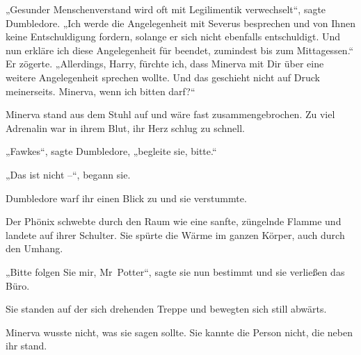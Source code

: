 „Gesunder Menschenverstand wird oft mit Legilimentik verwechselt“, sagte Dumbledore. „Ich werde die Angelegenheit mit Severus besprechen und von Ihnen keine Entschuldigung fordern, solange er sich nicht ebenfalls entschuldigt. Und nun erkläre ich diese Angelegenheit für beendet, zumindest bis zum Mittagessen.“ Er zögerte. „Allerdings, Harry, fürchte ich, dass Minerva mit Dir über eine weitere Angelegenheit sprechen wollte. Und das geschieht nicht auf Druck meinerseits. Minerva, wenn ich bitten darf?“

Minerva stand aus dem Stuhl auf und wäre fast zusammengebrochen. Zu viel Adrenalin war in ihrem Blut, ihr Herz schlug zu schnell.

„Fawkes“, sagte Dumbledore, „begleite sie, bitte.“

„Das ist nicht –“, begann sie.

Dumbledore warf ihr einen Blick zu und sie verstummte.

Der Phönix schwebte durch den Raum wie eine sanfte, züngelnde Flamme und landete auf ihrer Schulter. Sie spürte die Wärme im ganzen Körper, auch durch den Umhang.

„Bitte folgen Sie mir, Mr~Potter“, sagte sie nun bestimmt und sie verließen das Büro.

\later

Sie standen auf der sich drehenden Treppe und bewegten sich still abwärts.

Minerva wusste nicht, was sie sagen sollte. Sie kannte die Person nicht, die neben ihr stand.


